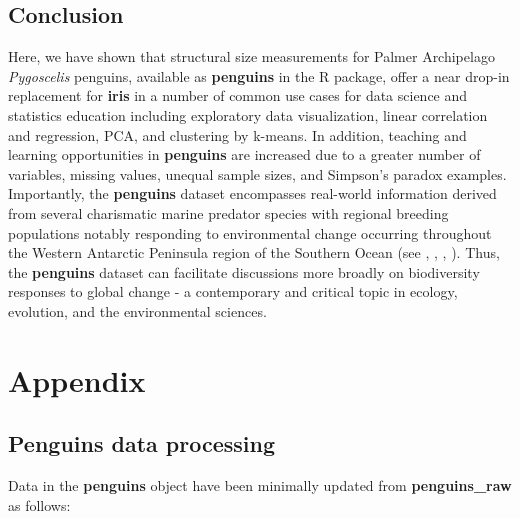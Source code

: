 \hypertarget{conclusion}{%
\subsection{Conclusion}\label{conclusion}}

Here, we have shown that structural size measurements for Palmer
Archipelago \emph{Pygoscelis} penguins, available as \textbf{penguins}
in the  R package, offer a near drop-in
replacement for \textbf{iris} in a number of common use cases for data
science and statistics education including exploratory data
visualization, linear correlation and regression, PCA, and clustering by
k-means. In addition, teaching and learning opportunities in
\textbf{penguins} are increased due to a greater number of variables,
missing values, unequal sample sizes, and Simpson's paradox examples.
Importantly, the \textbf{penguins} dataset encompasses real-world
information derived from several charismatic marine predator species
with regional breeding populations notably responding to environmental
change occurring throughout the Western Antarctic Peninsula region of
the Southern Ocean (see \citet{bestelmeyer_analysis_2011},
\citet{gorman_ecological_2014}, \citet{gorman_integrative_2015},
\citet{gorman_population_2017}). Thus, the \textbf{penguins} dataset can
facilitate discussions more broadly on biodiversity responses to global
change - a contemporary and critical topic in ecology, evolution, and
the environmental sciences.

\hypertarget{appendix}{%
\section*{Appendix}\label{appendix}}

\hypertarget{penguins-data-processing}{%
\subsection{Penguins data processing}\label{penguins-data-processing}}

Data in the \textbf{penguins} object have been minimally updated from
\textbf{penguins\_raw} as follows:

